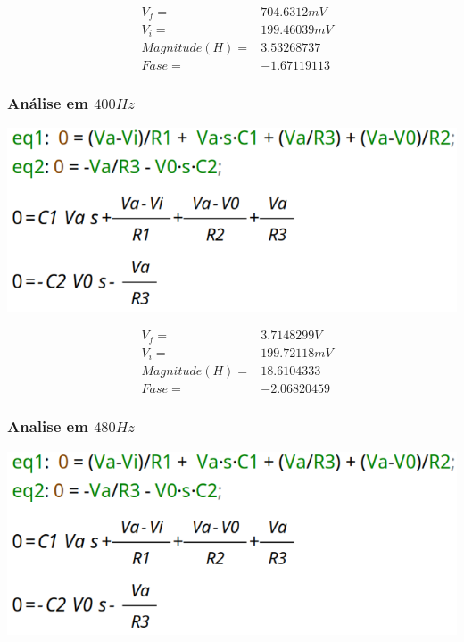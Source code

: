 \documentclass[12pt,twoside, a4paper, twocolumn]{article}
\begin{document}
\begin{equation*}
    \begin{aligned}
         & V_f =          & 704.6312mV  \\
         & V_i =          & 199.46039mV \\
         & Magnitude(H) = & 3.53268737  \\
         & Fase =         & -1.67119113
    \end{aligned}
\end{equation*}




\subsubsection{Análise em $400Hz$}




\begin{adjustbox}{scale=0.09}
    \includegraphics{eqs.png}
\end{adjustbox}




\begin{equation*}
    \begin{aligned}
         & V_f =          & 3.7148299V  \\
         & V_i =          & 199.72118mV \\
         & Magnitude(H) = & 18.6104333  \\
         & Fase =         & -2.06820459
    \end{aligned}
\end{equation*}




\subsubsection{Analise em $480Hz$}




\begin{adjustbox}{scale=0.09}
    \includegraphics{eqs.png}
\end{adjustbox}
\end{document}
